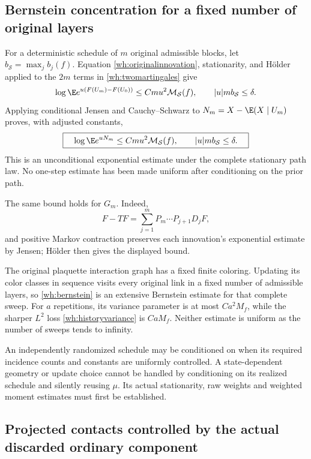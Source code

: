 \subsection{Bernstein concentration for a fixed number of original layers}

For a deterministic schedule of \(m\) original admissible blocks, let
\(b_{\mathcal S}=\max_jb_j(f)\). Equation \eqref{wh:originalinnovation}, stationarity, and Hölder applied to the \(2m\) terms in \eqref{wh:twomartingales} give
\[
 \log\E e^{u(F(U_m)-F(U_0))}
 \le Cm u^2\mathcal M_{\mathcal S}(f),
 \qquad |u|m b_{\mathcal S}\le\delta.
\]
Applying conditional Jensen and Cauchy--Schwarz to
\(N_m=X-\E(X\mid U_m)\) proves, with adjusted constants,
\begin{equation}
 \boxed{\quad
 \log\E e^{uN_m}
 \le Cm u^2\mathcal M_{\mathcal S}(f),
 \qquad |u|m b_{\mathcal S}\le\delta.
 \quad}
 \label{wh:bernstein}
\end{equation}
This is an unconditional exponential estimate under the complete stationary path law. No one-step estimate has been made uniform after conditioning on the prior path.

The same bound holds for \(G_m\). Indeed,
\[
 F-TF=\sum_{j=1}^mP_m\cdots P_{j+1}D_jF,
\]
and positive Markov contraction preserves each innovation's exponential estimate by Jensen; Hölder then gives the displayed bound.

The original plaquette interaction graph has a fixed finite coloring. Updating its color classes in sequence visits every original link in a fixed number of admissible layers, so \eqref{wh:bernstein} is an extensive Bernstein estimate for that complete sweep. For \(a\) repetitions, its variance parameter is at most \(Ca^2M_f\), while the sharper \(L^2\) loss \eqref{wh:historyvariance} is \(CaM_f\). Neither estimate is uniform as the number of sweeps tends to infinity.

An independently randomized schedule may be conditioned on when its required incidence counts and constants are uniformly controlled. A state-dependent geometry or update choice cannot be handled by conditioning on its realized schedule and silently reusing \(\mu\). Its actual stationarity, raw weights and weighted moment estimates must first be established.

\subsection{Projected contacts controlled by the actual discarded ordinary component}
\label{wh:contactsection}

